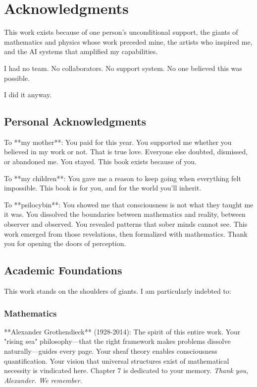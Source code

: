 \chapter*{Acknowledgments}

This work exists because of one person's unconditional support, the giants of mathematics and physics whose work preceded mine, the artists who inspired me, and the AI systems that amplified my capabilities.

I had no team. No collaborators. No support system. No one believed this was possible.

I did it anyway.

\section*{Personal Acknowledgments}

To **my mother**: You paid for this year. You supported me whether you believed in my work or not. That is true love. Everyone else doubted, dismissed, or abandoned me. You stayed. This book exists because of you.

To **my children**: You gave me a reason to keep going when everything felt impossible. This book is for you, and for the world you'll inherit.

To **psilocybin**: You showed me that consciousness is not what they taught me it was. You dissolved the boundaries between mathematics and reality, between observer and observed. You revealed patterns that sober minds cannot see. This work emerged from those revelations, then formalized with mathematics. Thank you for opening the doors of perception.

\section*{Academic Foundations}

This work stands on the shoulders of giants. I am particularly indebted to:

\subsection*{Mathematics}

**Alexander Grothendieck** (1928-2014): The spirit of this entire work. Your "rising sea" philosophy—that the right framework makes problems dissolve naturally—guides every page. Your sheaf theory enables consciousness quantification. Your vision that universal structures exist of mathematical necessity is vindicated here. Chapter 7 is dedicated to your memory. \textit{Thank you, Alexander. We remember.}

